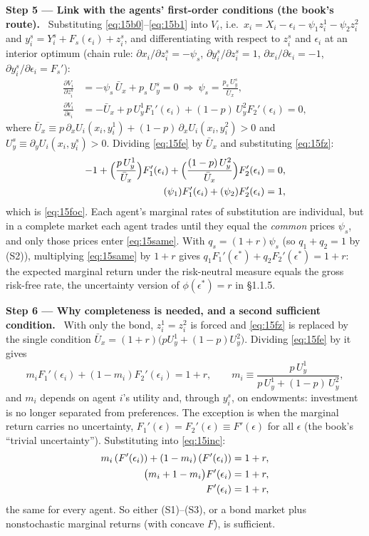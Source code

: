 \documentclass[11pt,a4paper]{article}
\numberwithin{equation}{section}
\newcommand{\step}[2]{\par\medskip\noindent\textbf{Step #1 --- #2.}~}
\begin{document}
\step{5}{Link with the agents' first-order conditions (the book's route)} Substituting
\eqref{eq:15b0}--\eqref{eq:15b1} into $V_i$, i.e.\ $x_i=X_i-\epsilon_i-\psi_1z_i^1-\psi_2z_i^2$ and
$y_i^s=Y_i^s+F_s(\epsilon_i)+z_i^s$, and differentiating with respect to $z_i^s$ and $\epsilon_i$ at
an interior optimum (chain rule: $\partial x_i/\partial z_i^s=-\psi_s$, $\partial y_i^s/\partial z_i^s=1$,
$\partial x_i/\partial\epsilon_i=-1$, $\partial y_i^s/\partial\epsilon_i=F_s'$):
\begin{align}
  \frac{\partial V_i}{\partial z_i^s} &= -\psi_s\,\bar U_x + p_s\,U_y^s = 0
     \ \Longrightarrow\ \psi_s = \frac{p_s\,U_y^s}{\bar U_x}, \label{eq:15fz}\\
  \frac{\partial V_i}{\partial \epsilon_i} &= -\bar U_x + p\,U_y^1F_1'(\epsilon_i) + (1-p)\,U_y^2F_2'(\epsilon_i) = 0, \label{eq:15fe}
\end{align}
where $\bar U_x\equiv p\,\partial_xU_i(x_i,y_i^1)+(1-p)\,\partial_xU_i(x_i,y_i^2)>0$ and $U_y^s\equiv\partial_yU_i(x_i,y_i^s)>0$.
Dividing \eqref{eq:15fe} by $\bar U_x$ and substituting \eqref{eq:15fz}:
\begin{align}
  -1 + \Big(\frac{p\,U_y^1}{\bar U_x}\Big)F_1'(\epsilon_i) + \Big(\frac{(1-p)\,U_y^2}{\bar U_x}\Big)F_2'(\epsilon_i) &= 0, \notag\\
  (\psi_1)F_1'(\epsilon_i) + (\psi_2)F_2'(\epsilon_i) &= 1, \label{eq:15same}
\end{align}
which is \eqref{eq:15foc}. Each agent's marginal rates of substitution are individual, but in a
complete market each agent trades until they equal the \emph{common} prices $\psi_s$, and only
those prices enter \eqref{eq:15same}. With $q_s=(1+r)\psi_s$ (so $q_1+q_2=1$ by (S2)),
multiplying \eqref{eq:15same} by $1+r$ gives $q_1F_1'(\epsilon^\ast)+q_2F_2'(\epsilon^\ast)=1+r$: the
expected marginal return under the risk-neutral measure equals the gross risk-free rate, the
uncertainty version of $\phi(\epsilon^\ast)=r$ in \S1.1.5.

\step{6}{Why completeness is needed, and a second sufficient condition} With only the bond,
$z_i^1=z_i^2$ is forced and \eqref{eq:15fz} is replaced by the single condition
$\bar U_x=(1+r)\big(pU_y^1+(1-p)U_y^2\big)$. Dividing \eqref{eq:15fe} by it gives
\begin{equation}\label{eq:15inc}
  m_iF_1'(\epsilon_i)+(1-m_i)F_2'(\epsilon_i)=1+r, \qquad
  m_i\equiv\frac{p\,U_y^1}{p\,U_y^1+(1-p)\,U_y^2},
\end{equation}
and $m_i$ depends on agent $i$'s utility and, through $y_i^s$, on endowments: investment is no
longer separated from preferences. The exception is when the marginal return carries no
uncertainty, $F_1'(\epsilon)=F_2'(\epsilon)\equiv F'(\epsilon)$ for all $\epsilon$ (the book's
``trivial uncertainty''). Substituting into \eqref{eq:15inc}:
\begin{align}
  m_i\,(F'(\epsilon_i)) + (1-m_i)\,(F'(\epsilon_i)) &= 1+r, \notag\\
  \big(m_i + 1 - m_i\big)F'(\epsilon_i) &= 1+r, \notag\\
  F'(\epsilon_i) &= 1+r, \notag
\end{align}
the same for every agent. So either (S1)--(S3), or a bond market plus nonstochastic marginal
returns (with concave $F$), is sufficient.
\end{document}
